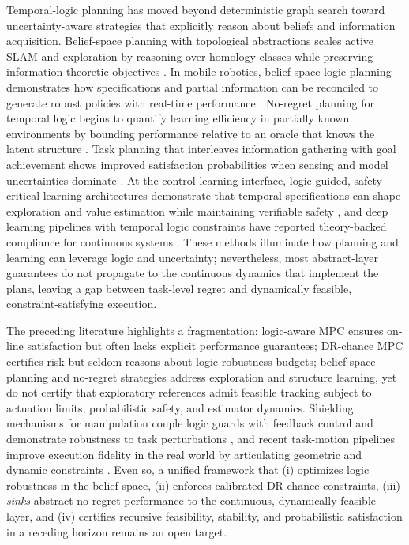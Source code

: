 \documentclass[journal]{IEEEtran}
\theoremstyle{definition}
\begin{document}
 
Temporal-logic planning has moved beyond deterministic graph search toward uncertainty-aware strategies that explicitly reason about beliefs and information acquisition. Belief-space planning with topological abstractions scales active SLAM and exploration by reasoning over homology classes while preserving information-theoretic objectives \cite{Garg2023IJRR_TopBSP}. In mobile robotics, belief-space logic planning demonstrates how specifications and partial information can be reconciled to generate robust policies with real-time performance \cite{Liu2024TRO_BeliefSTL}. No-regret planning for temporal logic begins to quantify learning efficiency in partially known environments by bounding performance relative to an oracle that knows the latent structure \cite{Zhao2025IJRR_NoRegret}. Task planning that interleaves information gathering with goal achievement shows improved satisfaction probabilities when sensing and model uncertainties dominate \cite{Li2024TIV_TL_ActiveInfo}. At the control-learning interface, logic-guided, safety-critical learning architectures demonstrate that temporal specifications can shape exploration and value estimation while maintaining verifiable safety \cite{Cohen2023ARC_SafeMBRL}, and deep learning pipelines with temporal logic constraints have reported theory-backed compliance for continuous systems \cite{Cai2025TAC_SafeLTL}. These methods illuminate how planning and learning can leverage logic and uncertainty; nevertheless, most abstract-layer guarantees do not propagate to the continuous dynamics that implement the plans, leaving a gap between task-level regret and dynamically feasible, constraint-satisfying execution.

 
The preceding literature highlights a fragmentation: logic-aware MPC ensures on-line satisfaction but often lacks explicit performance guarantees; DR-chance MPC certifies risk but seldom reasons about logic robustness budgets; belief-space planning and no-regret strategies address exploration and structure learning, yet do not certify that exploratory references admit feasible tracking subject to actuation limits, probabilistic safety, and estimator dynamics. Shielding mechanisms for manipulation couple logic guards with feedback control and demonstrate robustness to task perturbations \cite{Sutton2023TRO_ShieldedControl}, and recent task-motion pipelines improve execution fidelity in the real world by articulating geometric and dynamic constraints \cite{Pan2024TRO_TMP}. Even so, a unified framework that (i) optimizes logic robustness in the belief space, (ii) enforces calibrated DR chance constraints, (iii) \emph{sinks} abstract no-regret performance to the continuous, dynamically feasible layer, and (iv) certifies recursive feasibility, stability, and probabilistic satisfaction in a receding horizon remains an open target.\vspace{0.2em}
\end{document}
